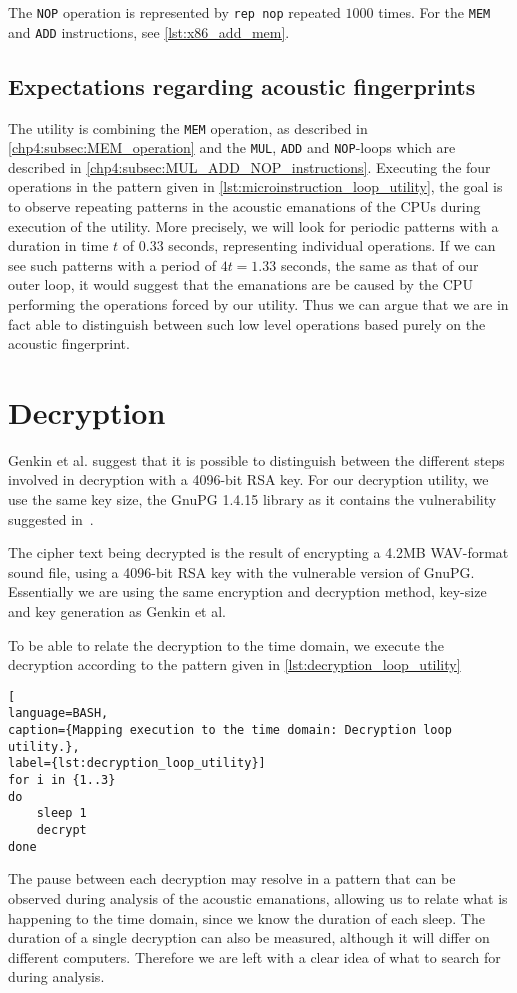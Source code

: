 The \texttt{NOP} operation is represented by \texttt{rep nop} repeated \(1000\) times.
For the \texttt{MEM} and \texttt{ADD} instructions, see \autoref{lst:x86_add_mem}.


\subsection{Expectations regarding acoustic fingerprints}
The utility is combining the \texttt{MEM} operation, as described in \autoref{chp4:subsec:MEM_operation} and the \texttt{MUL}, \texttt{ADD} and \texttt{NOP}-loops which are described in \autoref{chp4:subsec:MUL_ADD_NOP_instructions}.
Executing the four operations in the pattern given in \autoref{lst:microinstruction_loop_utility}, the goal is to observe repeating patterns in the acoustic emanations of the \gls{CPU}s during execution of the utility.
More precisely, we will look for periodic patterns with a duration in time \(t\) of \(0.33\) seconds, representing individual operations. 
If we can see such patterns with a period of \(4t = 1.33\) seconds, the same as that of our outer loop, it would suggest that the emanations are be caused by the \gls{CPU} performing the operations forced by our utility.
Thus we can argue that we are in fact able to distinguish between such low level operations based purely on the acoustic fingerprint. 


\section{Decryption}\label{chp4:sec:decryption}
Genkin et al. suggest that it is possible to distinguish between the different steps involved in decryption with a 4096-bit RSA key.
For our decryption utility, we use the same key size, the GnuPG 1.4.15 library as it contains the vulnerability suggested in~\cite[Sec.~9.1]{DBLP:conf/crypto/GenkinST14}. 

The cipher text being decrypted is the result of encrypting a 4.2MB WAV-format sound file, using a 4096-bit RSA key with the vulnerable version of GnuPG.
Essentially we are using the same encryption and decryption method, key-size and key generation as Genkin et al. 

To be able to relate the decryption to the time domain, we execute the decryption according to the pattern given in \autoref{lst:decryption_loop_utility}

\begin{lstlisting}[
language=BASH, 
caption={Mapping execution to the time domain: Decryption loop utility.}, 
label={lst:decryption_loop_utility}]
for i in {1..3}
do
    sleep 1
    decrypt
done
\end{lstlisting}

The pause between each decryption may resolve in a pattern that can be observed during analysis of the acoustic emanations, allowing us to relate what is happening to the time domain, since we know the duration of each sleep.
The duration of a single decryption can also be measured, although it will differ on different computers.
Therefore we are left with a clear idea of what to search for during analysis.
